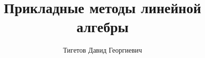 \documentclass[a4paper,12pt]{book}
\begin{document}
    \title{Прикладные методы линейной алгебры}
    \author{Тигетов Давид Георгиевич}
    \maketitle

    \tableofcontents

    

    

    

    

    

    

    

    

\end{document}
